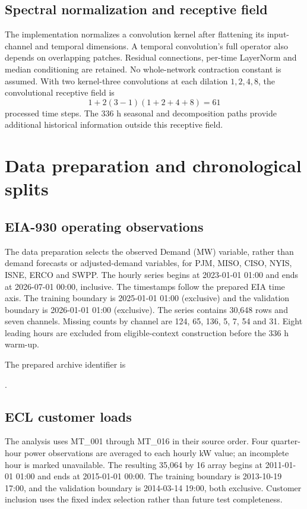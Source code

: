 \documentclass[11pt,a4paper]{article}
\begin{document}
\subsection{Spectral normalization and receptive field}
The implementation normalizes a convolution kernel after flattening its input-channel and temporal dimensions. A temporal convolution's full operator also depends on overlapping patches. Residual connections, per-time LayerNorm and median conditioning are retained. No whole-network contraction constant is assumed. With two kernel-three convolutions at each dilation $1,2,4,8$, the convolutional receptive field is
\begin{equation}
 1+2(3-1)(1+2+4+8)=61
\end{equation}
processed time steps. The 336 h seasonal and decomposition paths provide additional historical information outside this receptive field.

\section{Data preparation and chronological splits}
\subsection{EIA-930 operating observations}
The data preparation selects the observed Demand (MW) variable, rather than demand forecasts or adjusted-demand variables, for PJM, MISO, CISO, NYIS, ISNE, ERCO and SWPP. The hourly series begins at 2023-01-01 01:00 and ends at 2026-07-01 00:00, inclusive. The timestamps follow the prepared EIA time axis. The training boundary is 2025-01-01 01:00 (exclusive) and the validation boundary is 2026-01-01 01:00 (exclusive). The series contains 30,648 rows and seven channels. Missing counts by channel are 124, 65, 136, 5, 7, 54 and 31. Eight leading hours are excluded from eligible-context construction before the 336 h warm-up.

The prepared archive identifier is\par\smallskip
{\footnotesize\ttfamily{}}.

\subsection{ECL customer loads}
The analysis uses MT\_001 through MT\_016 in their source order. Four quarter-hour power observations are averaged to each hourly kW value; an incomplete hour is marked unavailable. The resulting 35,064 by 16 array begins at 2011-01-01 01:00 and ends at 2015-01-01 00:00. The training boundary is 2013-10-19 17:00, and the validation boundary is 2014-03-14 19:00, both exclusive. Customer inclusion uses the fixed index selection rather than future test completeness.
\end{document}
